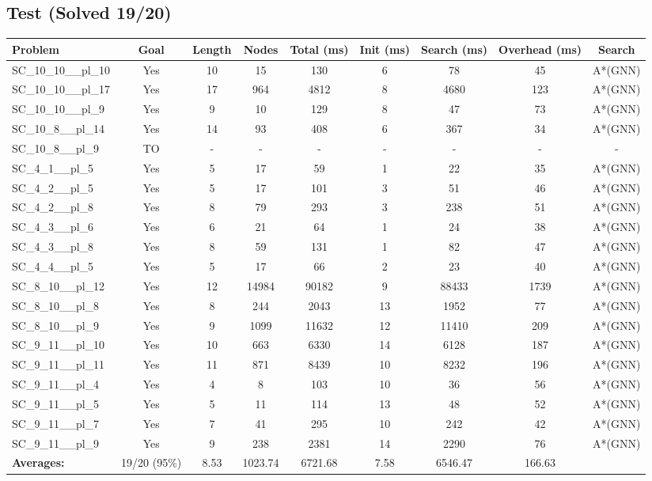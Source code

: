 \documentclass{article}
\begin{document}
\subsection*{Test (Solved 19/20)}
\begin{tabular}{lcccccccc}
\toprule
Problem & Goal & Length & Nodes & Total (ms) & Init (ms) & Search (ms) & Overhead (ms) & Search \\
\midrule
SC\_10\_10\_\_pl\_10 & Yes & 10 & 15 & 130 & 6 & 78 & 45 & A*(GNN) \\
SC\_10\_10\_\_pl\_17 & Yes & 17 & 964 & 4812 & 8 & 4680 & 123 & A*(GNN) \\
SC\_10\_10\_\_pl\_9 & Yes & 9 & 10 & 129 & 8 & 47 & 73 & A*(GNN) \\
SC\_10\_8\_\_pl\_14 & Yes & 14 & 93 & 408 & 6 & 367 & 34 & A*(GNN) \\
SC\_10\_8\_\_pl\_9 & TO & - & - & - & - & - & - & - \\
SC\_4\_1\_\_pl\_5 & Yes & 5 & 17 & 59 & 1 & 22 & 35 & A*(GNN) \\
SC\_4\_2\_\_pl\_5 & Yes & 5 & 17 & 101 & 3 & 51 & 46 & A*(GNN) \\
SC\_4\_2\_\_pl\_8 & Yes & 8 & 79 & 293 & 3 & 238 & 51 & A*(GNN) \\
SC\_4\_3\_\_pl\_6 & Yes & 6 & 21 & 64 & 1 & 24 & 38 & A*(GNN) \\
SC\_4\_3\_\_pl\_8 & Yes & 8 & 59 & 131 & 1 & 82 & 47 & A*(GNN) \\
SC\_4\_4\_\_pl\_5 & Yes & 5 & 17 & 66 & 2 & 23 & 40 & A*(GNN) \\
SC\_8\_10\_\_pl\_12 & Yes & 12 & 14984 & 90182 & 9 & 88433 & 1739 & A*(GNN) \\
SC\_8\_10\_\_pl\_8 & Yes & 8 & 244 & 2043 & 13 & 1952 & 77 & A*(GNN) \\
SC\_8\_10\_\_pl\_9 & Yes & 9 & 1099 & 11632 & 12 & 11410 & 209 & A*(GNN) \\
SC\_9\_11\_\_pl\_10 & Yes & 10 & 663 & 6330 & 14 & 6128 & 187 & A*(GNN) \\
SC\_9\_11\_\_pl\_11 & Yes & 11 & 871 & 8439 & 10 & 8232 & 196 & A*(GNN) \\
SC\_9\_11\_\_pl\_4 & Yes & 4 & 8 & 103 & 10 & 36 & 56 & A*(GNN) \\
SC\_9\_11\_\_pl\_5 & Yes & 5 & 11 & 114 & 13 & 48 & 52 & A*(GNN) \\
SC\_9\_11\_\_pl\_7 & Yes & 7 & 41 & 295 & 10 & 242 & 42 & A*(GNN) \\
SC\_9\_11\_\_pl\_9 & Yes & 9 & 238 & 2381 & 14 & 2290 & 76 & A*(GNN) \\
\textbf{Averages:} & 19/20 (95\%) & 8.53 & 1023.74 & 6721.68 & 7.58 & 6546.47 & 166.63 & \\
\bottomrule
\end{tabular}
\\[0.7cm]
\end{document}
